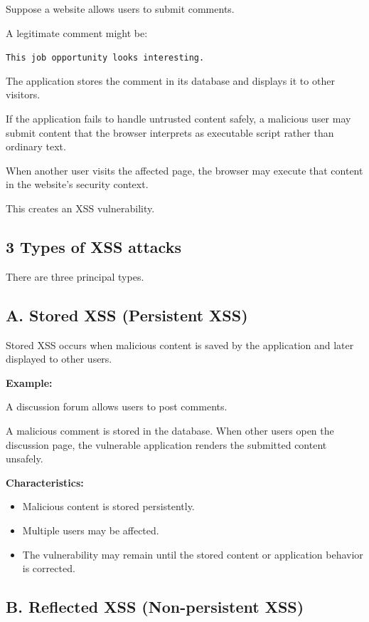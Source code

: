 Suppose a website allows users to submit comments.

A legitimate comment might be:

\texttt{This job opportunity looks interesting.}

The application stores the comment in its database and displays it to other visitors.

If the application fails to handle untrusted content safely, a malicious user may submit content that the browser interprets as executable script rather than ordinary text.

When another user visits the affected page, the browser may execute that content in the website's security context.

This creates an XSS vulnerability.

\subsection{3 Types of XSS attacks}

There are three principal types.

\subsection{A. Stored XSS (Persistent XSS)}

Stored XSS occurs when malicious content is saved by the application and later displayed to other users.

\textbf{Example:}

A discussion forum allows users to post comments.

A malicious comment is stored in the database. When other users open the discussion page, the vulnerable application renders the submitted content unsafely.

\textbf{Characteristics:}

\begin{itemize}
\item Malicious content is stored persistently.
\item Multiple users may be affected.
\item The vulnerability may remain until the stored content or application behavior is corrected.
\end{itemize}

\subsection{B. Reflected XSS (Non-persistent XSS)}

